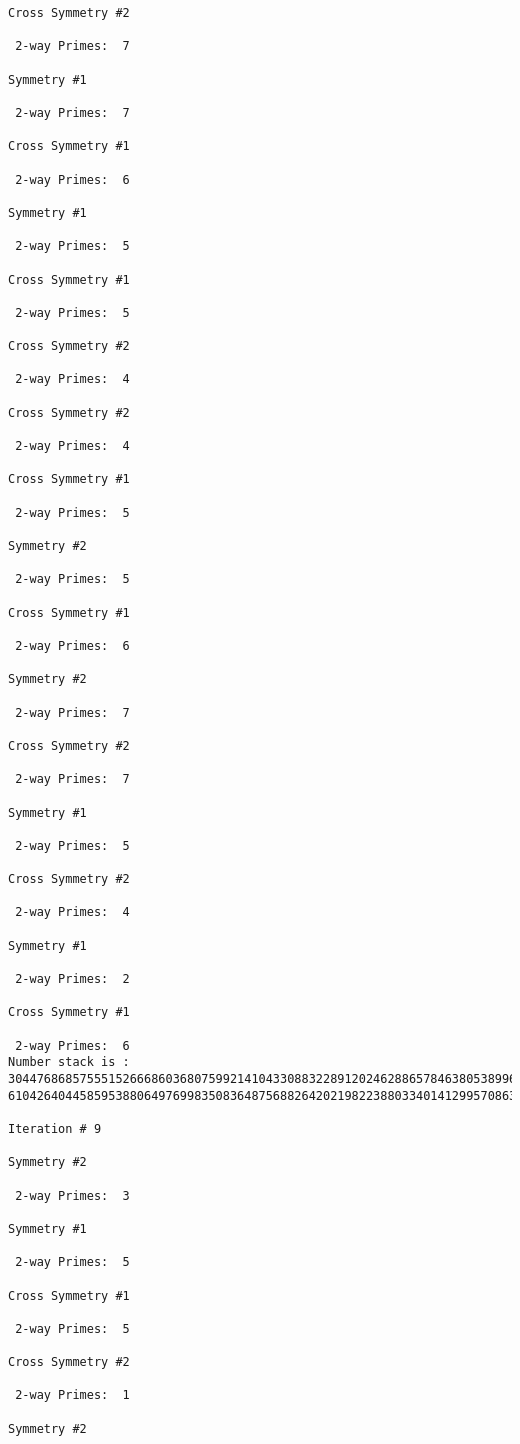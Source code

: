 {{{{\begin{verbatim}
Cross Symmetry #2

 2-way Primes: 	7

Symmetry #1

 2-way Primes: 	7

Cross Symmetry #1

 2-way Primes: 	6

Symmetry #1

 2-way Primes: 	5

Cross Symmetry #1

 2-way Primes: 	5

Cross Symmetry #2

 2-way Primes: 	4

Cross Symmetry #2

 2-way Primes: 	4

Cross Symmetry #1

 2-way Primes: 	5

Symmetry #2

 2-way Primes: 	5

Cross Symmetry #1

 2-way Primes: 	6

Symmetry #2

 2-way Primes: 	7

Cross Symmetry #2

 2-way Primes: 	7

Symmetry #1

 2-way Primes: 	5

Cross Symmetry #2

 2-way Primes: 	4

Symmetry #1

 2-way Primes: 	2

Cross Symmetry #1

 2-way Primes: 	6
Number stack is :
30447686857555152666860368075992141043308832289120246288657846380538996794608835958544046240163340857
61042640445859538806497699835083648756882642021982238803340141299570863068666251555758686744037580433

Iteration #	9

Symmetry #2

 2-way Primes: 	3

Symmetry #1

 2-way Primes: 	5

Cross Symmetry #1

 2-way Primes: 	5

Cross Symmetry #2

 2-way Primes: 	1

Symmetry #2


\end{verbatim}}}}}
